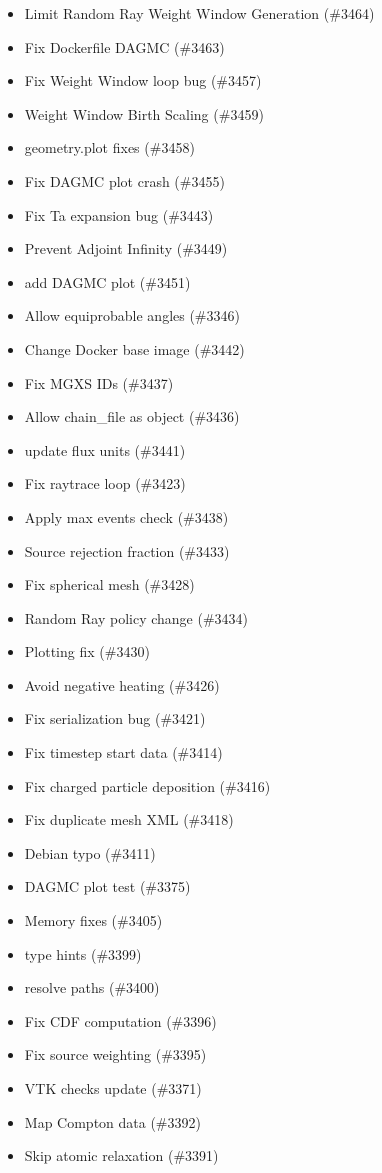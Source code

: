 \begin{itemize}
\item Limit Random Ray Weight Window Generation (\#3464)
\item Fix Dockerfile DAGMC (\#3463)
\item Fix Weight Window loop bug (\#3457)
\item Weight Window Birth Scaling (\#3459)
\item geometry.plot fixes (\#3458)
\item Fix DAGMC plot crash (\#3455)
\item Fix Ta expansion bug (\#3443)
\item Prevent Adjoint Infinity (\#3449)
\item add DAGMC plot (\#3451)
\item Allow equiprobable angles (\#3346)
\item Change Docker base image (\#3442)
\item Fix MGXS IDs (\#3437)
\item Allow chain\_file as object (\#3436)
\item update flux units (\#3441)
\item Fix raytrace loop (\#3423)
\item Apply max events check (\#3438)
\item Source rejection fraction (\#3433)
\item Fix spherical mesh (\#3428)
\item Random Ray policy change (\#3434)
\item Plotting fix (\#3430)
\item Avoid negative heating (\#3426)
\item Fix serialization bug (\#3421)
\item Fix timestep start data (\#3414)
\item Fix charged particle deposition (\#3416)
\item Fix duplicate mesh XML (\#3418)
\item Debian typo (\#3411)
\item DAGMC plot test (\#3375)
\item Memory fixes (\#3405)
\item type hints (\#3399)
\item resolve paths (\#3400)
\item Fix CDF computation (\#3396)
\item Fix source weighting (\#3395)
\item VTK checks update (\#3371)
\item Map Compton data (\#3392)
\item Skip atomic relaxation (\#3391)

\end{itemize}
